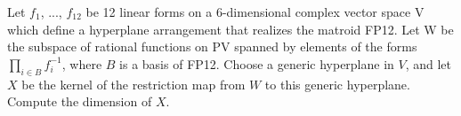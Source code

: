 Let $f_1$, ..., $f_{12}$ be 12 linear forms on a 6-dimensional complex vector space V which define a hyperplane arrangement that realizes the matroid FP12. Let W be the subspace of rational functions on PV spanned by elements of the forms $\prod_{i \in B} f_i^{-1}$, where $B$ is a basis of FP12. Choose a generic hyperplane in $V$, and let $X$ be the kernel of the restriction map from $W$ to this generic hyperplane. Compute the dimension of $X$.
